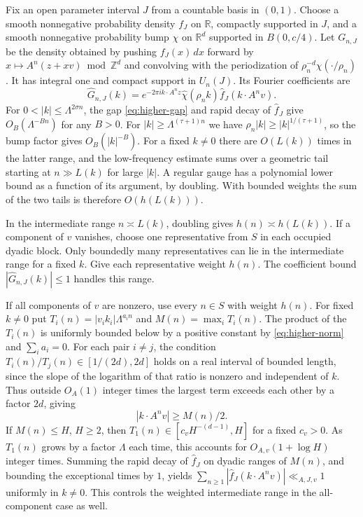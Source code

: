 \documentclass[11pt,a4paper,reqno]{amsart}
\theoremstyle{definition}
\theoremstyle{remark}
\numberwithin{equation}{section}
\begin{document}
Fix an open parameter interval \(J\) from a countable basis in \((0,1)\). Choose a smooth nonnegative probability density \(f_J\) on \(\mathbb R\), compactly supported in \(J\), and a smooth nonnegative probability bump \(\chi\) on \(\mathbb R^d\) supported in \(B(0,c/4)\). Let \(G_{n,J}\) be the density obtained by pushing \(f_J(x)\,dx\) forward by \(x\mapsto A^n(z+xv)\bmod\mathbb Z^d\) and convolving with the periodization of \(\rho_n^{-d}\chi(\cdot/\rho_n)\). It has integral one and compact support in \(U_n(J)\). Its Fourier coefficients are
\begin{equation}\label{eq:higher-density}
 \widehat G_{n,J}(k)
 =e^{-2\pi i k\cdot A^nz}\widehat\chi(\rho_n k)
                   \widehat f_J(k\cdot A^n v).
\end{equation}
For \(0<|k|\le\Lambda^{2\sigma n}\), the gap \eqref{eq:higher-gap} and rapid decay of \(\widehat f_J\) give \(O_B(\Lambda^{-Bn})\) for any \(B>0\). For \(|k|\ge\Lambda^{(\tau+1)n}\) we have \(\rho_n|k|\ge |k|^{1/(\tau+1)}\), so the bump factor gives \(O_B(|k|^{-B})\). For a fixed \(k\ne0\) there are \(O(L(k))\) times in the latter range, and the low-frequency estimate sums over a geometric tail starting at \(n\gg L(k)\) for large \(|k|\). A regular gauge has a polynomial lower bound as a function of its argument, by doubling. With bounded weights the sum of the two tails is therefore \(O(h(L(k)))\).

In the intermediate range \(n\asymp L(k)\), doubling gives \(h(n)\asymp h(L(k))\). If a component of \(v\) vanishes, choose one representative from \(S\) in each occupied dyadic block. Only boundedly many representatives can lie in the intermediate range for a fixed \(k\). Give each representative weight \(h(n)\). The coefficient bound \(|\widehat G_{n,J}(k)|\le1\) handles this range.

If all components of \(v\) are nonzero, use every \(n\in S\) with weight \(h(n)\). For fixed \(k\ne0\) put \(T_i(n)=|v_i k_i|\Lambda^{a_i n}\) and \(M(n)=\max_i T_i(n)\). The product of the \(T_i(n)\) is uniformly bounded below by a positive constant by \eqref{eq:higher-norm} and \(\sum_i a_i=0\). For each pair \(i\ne j\), the condition \(T_i(n)/T_j(n)\in[1/(2d),2d]\) holds on a real interval of bounded length, since the slope of the logarithm of that ratio is nonzero and independent of \(k\). Thus outside \(O_A(1)\) integer times the largest term exceeds each other by a factor \(2d\), giving
\[
 |k\cdot A^n v|\ge M(n)/2 .
\]
If \(M(n)\le H\), \(H\ge2\), then \(T_1(n)\in[c_v H^{-(d-1)},H]\) for a fixed \(c_v>0\). As \(T_1(n)\) grows by a factor \(\Lambda\) each time, this accounts for \(O_{A,v}(1+\log H)\) integer times. Summing the rapid decay of \(\widehat f_J\) on dyadic ranges of \(M(n)\), and bounding the exceptional times by \(1\), yields \(\sum_{n\ge1}|\widehat f_J(k\cdot A^n v)|\ll_{A,J,v}1\) uniformly in \(k\ne0\). This controls the weighted intermediate range in the all-component case as well.
\end{document}
